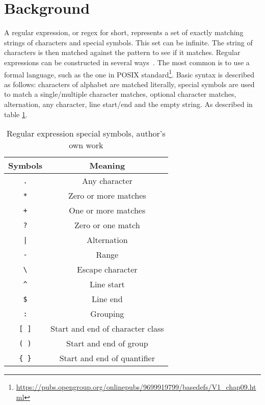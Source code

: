 \documentclass[10pt,onecolumn,twoside,english,a4paper]{article}
\begin{document}
\section{Background} \label{Background}
A regular expression, or regex for short, represents a set of exactly matching strings of characters and special symbols. This set can be infinite. The string of characters is then matched against the pattern to see if it matches. Regular expressions can be constructed in several ways~\cite{wang2014techniques}. The most common is to use a formal language, such as the one in POSIX standard\footnote{\url{https://pubs.opengroup.org/onlinepubs/9699919799/basedefs/V1_chap09.html}}.
Basic syntax is described as follows: characters of alphabet are matched literally, special symbols are used to match a single/multiple character matches, optional character matches, alternation, any character, line start/end and the empty string. As described in table \ref{table:regex_special_symbols}.


\begin{table}[h!]
  \centering
  \begin{tabular}{ |c|c| }
    \hline
    \textbf{Symbols}        & \textbf{Meaning}                 \\
    \hline
    \texttt{.}              & Any character                    \\
    \hline
    \texttt{*}              & Zero or more matches             \\
    \hline
    \texttt{+}              & One or more matches              \\
    \hline
    \texttt{?}              & Zero or one match                \\
    \hline
    \texttt{|}              & Alternation                      \\
    \hline
    \texttt{-}              & Range                            \\
    \hline
    \texttt{\textbackslash} & Escape character                 \\
    \hline
    \texttt{\^{}}           & Line start                       \\
    \hline
    \texttt{\$}             & Line end                         \\
    \hline
    \texttt{:}              & Grouping                         \\
    \hline
    \texttt{[ ]}            & Start and end of character class \\
    \hline
    \texttt{( )}            & Start and end of group           \\
    \hline
    \texttt{\{ \}}          & Start and end of quantifier      \\
    \hline
  \end{tabular}
  \caption{Regular expression special symbols, author's own work }
  \label{table:regex_special_symbols}
\end{table}
\end{document}
